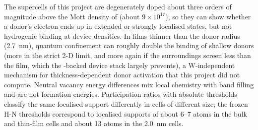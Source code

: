 \begin{keyresult}
The supercells of this project are degenerately doped about three orders of magnitude above the Mott density of
\InO{} (about $9\times10^{17}$\cmcu{}), so they can show whether a donor's electron ends up in extended or strongly
localised states, but not hydrogenic binding at device densities. In films thinner than the donor radius (2.7~nm),
quantum confinement can roughly double the binding of shallow donors (more in the strict 2-D limit, and more again if
the surroundings screen less than the film, which the \HfO{}-backed device stack largely prevents), a W-independent
mechanism for thickness-dependent donor activation that this project did not compute. Neutral vacancy energy differences mix local
chemistry with band filling and are not formation energies. Participation ratios with absolute thresholds classify the
same localised support differently in cells of different size; the frozen H-N thresholds correspond to localised
supports of about 6--7 atoms in the bulk and thin-film cells and about 13 atoms in the 2.0~nm cells.
\end{keyresult}
